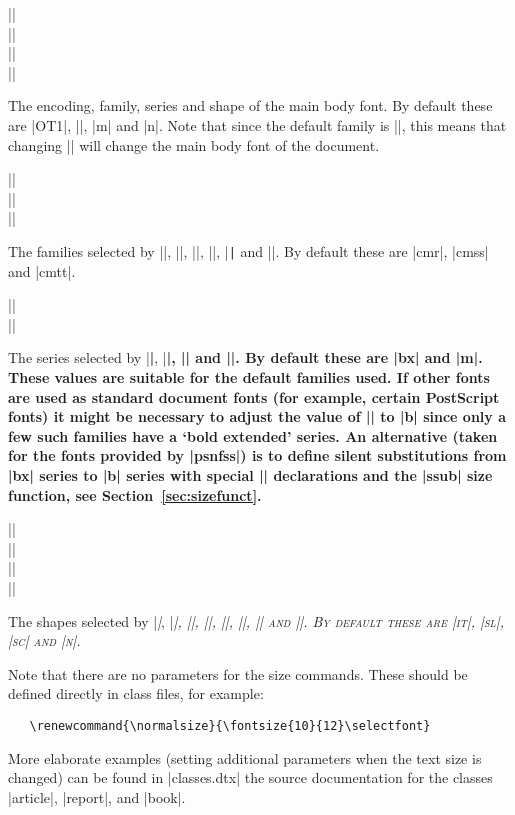 \documentclass{ltxguide}[1995/11/28]
\begin{document}
\begin{decl}
 |\encodingdefault| \\
 |\familydefault|   \\
 |\seriesdefault|   \\
 |\shapedefault|
\end{decl}
The encoding, family, series and shape of the main body font.  By
default these are |OT1|, |\rmdefault|, |m| and |n|.  Note that since
the default family is |\rmdefault|, this means that changing
|\rmdefault| will change the main body font of the document.
 
\begin{decl}
 |\rmdefault|  \\
 |\sfdefault| \\
 |\ttdefault|
\end{decl}
The families selected by |\textrm|, |\rmfamily|, |\textsf|,
|\sffamily|, |\texttt| and |\ttfamily|.  By default these are |cmr|,
|cmss| and |cmtt|.
 
\begin{decl}
 |\bfdefault| \\
 |\mddefault|
\end{decl}
The series selected by |\textbf|, |\bfseries|, |\textmd| and
|\mdseries|.  By default these are |bx| and |m|.
These values are suitable for the default families used. If other
fonts are used as standard document fonts (for example, certain
PostScript fonts) it might be necessary to adjust the value of
|\bfdefault| to |b| since only a few such families have a `bold
extended' series.  An alternative (taken for the fonts provided by
|psnfss|) is to define silent substitutions from |bx| series to |b|
series with special |\DeclareFontShape| declarations and the |ssub|
size function, see Section~\ref{sec:sizefunct}.
 
 
\begin{decl}
 |\itdefault| \\
 |\sldefault| \\
 |\scdefault| \\
 |\updefault|
\end{decl}
The shapes selected by |\textit|, |\itshape|, |\textsl|, |\slshape|,
|\textsc|, |\scshape|, |\textup| and |\upshape|.  By default these are
|it|, |sl|, |sc| and |n|.
 
Note that there are no parameters for the size commands.  These should
be defined directly in class files, for example:
\begin{verbatim}
   \renewcommand{\normalsize}{\fontsize{10}{12}\selectfont}
\end{verbatim}
More elaborate examples (setting additional parameters when the text
size is changed) can be found in |classes.dtx| the source
documentation for the classes |article|, |report|, and |book|.
 
\end{document}
